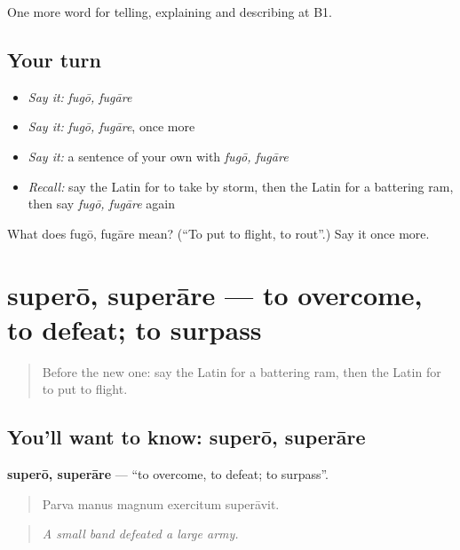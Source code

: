 \begin{grammarlens}[title={What you've built}]
One more word for telling, explaining and describing at B1.
\end{grammarlens}

\subsection*{Your turn}
\begin{itemize}
\raggedright
  \item \emph{Say it:} \emph{fugō, fugāre}
  \item \emph{Say it:} \emph{fugō, fugāre}, once more
  \item \emph{Say it:} a sentence of your own with \emph{fugō, fugāre}
  \item \emph{Recall:} say the Latin for to take by storm, then the Latin for a battering ram, then say \emph{fugō, fugāre} again
\end{itemize}

\begin{tcolorbox}[breakable,colback=teal!4,colframe=teal!35!black,title={Before you move on}]
What does fugō, fugāre mean? (\textquotedblleft{}To put to flight, to rout\textquotedblright{}.) Say it once more.
\end{tcolorbox}
\section[superō, superāre]{superō, superāre — to overcome, to defeat; to surpass}

\label{lesson:LA-C342-supero}



\begin{quote}
Before the new one: say the Latin for a battering ram, then the Latin for to put to flight.
\end{quote}

\subsection*{You'll want to know: superō, superāre}
\textbf{superō, superāre} — \textquotedblleft{}to overcome, to defeat; to surpass\textquotedblright{}.

\begin{quote}
Parva manus magnum exercitum superāvit.
\end{quote}

\begin{quote}
\emph{A small band defeated a large army.}
\end{quote}

